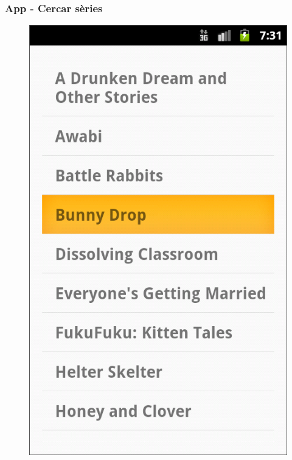 \documentclass{beamer}
\begin{document}
	\begin{frame}
	\frametitle{App - Cercar sèries}
		\begin{figure}
			\centering
			\includegraphics[scale=0.23]{series_list.png}\hspace*{3ex}

\end{figure}
\end{frame}
\end{document}
